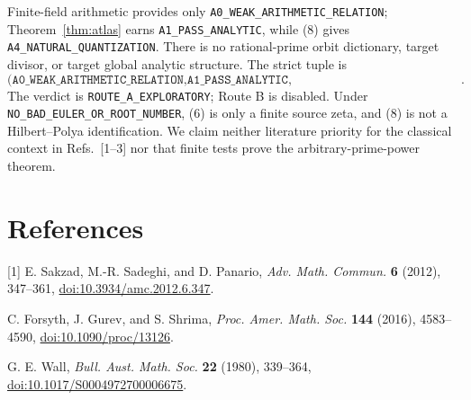 \documentclass[10pt]{article}
\begin{document}
Finite-field arithmetic provides only
\texttt{A0\_WEAK\_ARITHMETIC\_RELATION}; Theorem~\ref{thm:atlas} earns
\texttt{A1\_PASS\_ANALYTIC}, while (8) gives
\texttt{A4\_NATURAL\_QUANTIZATION}.  There is no rational-prime orbit
dictionary, target divisor, or target global analytic structure.  The strict
tuple is
\[
\texttt{(A0\_WEAK\_ARITHMETIC\_RELATION,A1\_PASS\_ANALYTIC,
A2\_FAIL,A3\_FAIL,A4\_NATURAL\_QUANTIZATION)}.
\]
The verdict is \texttt{ROUTE\_A\_EXPLORATORY}; Route B is disabled.  Under
\texttt{NO\_BAD\_EULER\_OR\_ROOT\_NUMBER}, (6) is only a finite source zeta,
and (8) is not a Hilbert--Polya identification.  We claim neither literature
priority for the classical context in Refs.~[1--3] nor that finite tests prove
the arbitrary-prime-power theorem.

\section*{References}
\begingroup\footnotesize\setlength{\parindent}{0pt}\setlength{\parskip}{2pt}
[1] E. Sakzad, M.-R. Sadeghi, and D. Panario, \emph{Adv. Math. Commun.}
\textbf{6} (2012), 347--361,
\href{https://doi.org/10.3934/amc.2012.6.347}{doi:10.3934/amc.2012.6.347}.\par
[2] C. Forsyth, J. Gurev, and S. Shrima, \emph{Proc. Amer. Math. Soc.}
\textbf{144} (2016), 4583--4590,
\href{https://doi.org/10.1090/proc/13126}{doi:10.1090/proc/13126}.\par
[3] G. E. Wall, \emph{Bull. Aust. Math. Soc.} \textbf{22} (1980), 339--364,
\href{https://doi.org/10.1017/S0004972700006675}{doi:10.1017/S0004972700006675}.
\endgroup
\end{document}
